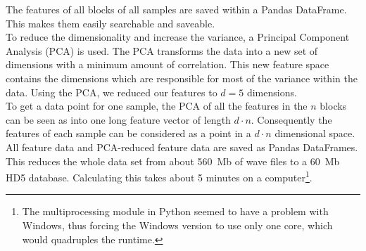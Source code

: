 The features of all blocks of all samples are saved within a Pandas DataFrame. This makes them easily searchable and saveable.\\
To reduce the dimensionality and increase the variance, a Principal Component Analysis (PCA) is used. The PCA transforms the data into a new set of dimensions with a minimum amount of correlation. This new feature space contains the dimensions which are responsible for most of the variance within the data. Using the PCA, we reduced our features to $d=5$ dimensions.\\
To get a data point for one sample, the PCA of all the features in the $n$ blocks can be seen as into one long feature vector of length $d \cdot n$. Consequently the features of each sample can be considered as a point in a $d \cdot n$ dimensional space.\\
All feature data and PCA-reduced feature data are saved as Pandas DataFrames. This reduces the whole data set from about 560~Mb of wave files to a 60~Mb HD5 database. Calculating this takes about 5 minutes on a computer\footnote{The multiprocessing module in Python seemed to have a problem with Windows, thus forcing the Windows version to use only one core, which would quadruples the runtime.}.
